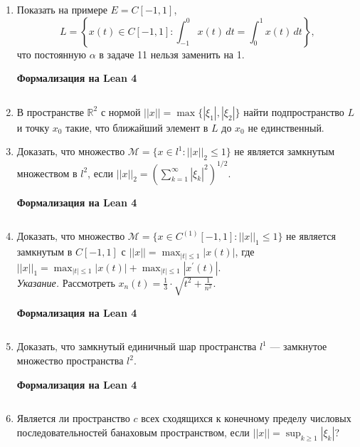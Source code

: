 \documentclass[12pt,a4paper]{article}
\begin{document}
\begin{enumerate}
\newpage
\item Показать на примере $E=C[-1,1]$,
$$L=\left\{x(t)\in C[-1,1] : \int_{-1}^{0}x(t) \, dt=\int_{0}^{1}x(t) \, dt\right\},$$
что постоянную $\alpha$ в задаче 11 нельзя заменить на 1.

\begin{center}\small\textbf{Формализация на Lean 4}\end{center}
\inputminted{lean}{FunAn/Section11_NormedSpaces/Task13.lean}

\newpage

\item В пространстве $\mathbb{R}^{2}$ с нормой $||x||=\max\{|\xi_{1}|,|\xi_{2}|\}$ найти подпространство $L$ и точку $x_{0}$ такие, что ближайший элемент в $L$ до $x_{0}$ не единственный.
\newpage
\item Доказать, что множество $\mathcal{M}=\{x\in l^{1}:||x||_{2}\le1\}$ не является замкнутым множеством в $l^{2}$, если $||x||_{2}=\left(\sum_{k=1}^{\infty}|\xi_{k}|^{2}\right)^{1/2}$.

\begin{center}\small\textbf{Формализация на Lean 4}\end{center}
\inputminted{lean}{FunAn/Section11_NormedSpaces/Task15.lean}

\newpage
\item Доказать, что множество $\mathcal{M}=\{x\in C^{(1)}[-1,1]:||x||_{1}\le1\}$ не является замкнутым в $C[-1,1]$ с $||x||=\max_{|t|\le1}|x(t)|$, где $||x||_{1}=\max_{|t|\le1}|x(t)|+\max_{|t|\le1}|x^{\prime}(t)|$.\\
\textit{Указание.} Рассмотреть $x_{n}(t)=\frac{1}{3}\cdot\sqrt{t^{2}+\frac{1}{n^{2}}}$.

\begin{center}\small\textbf{Формализация на Lean 4}\end{center}
\inputminted{lean}{FunAn/Section11_NormedSpaces/Task16.lean}

\newpage
\item Доказать, что замкнутый единичный шар пространства $l^{1}$ — замкнутое множество пространства $l^{2}$.

\begin{center}\small\textbf{Формализация на Lean 4}\end{center}
\inputminted{lean}{FunAn/Section11_NormedSpaces/Task17.lean}

\newpage

\item Является ли пространство $c$ всех сходящихся к конечному пределу числовых последовательностей банаховым пространством, если $||x||=\sup_{k\ge1}|\xi_{k}|$?
\end{enumerate}
\end{document}
